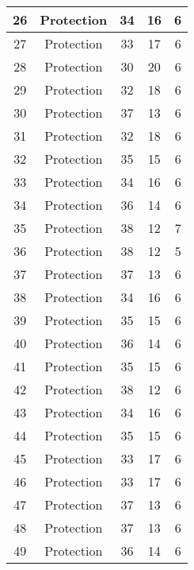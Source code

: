 \documentclass[results.tex]{subfiles}
\begin{document}
\begin{center}
\begin{tabular}{| c || c | c | c | c |}
    \hline
    26 & Protection & 34 & 16 & 6 \\ 
    \hline
    27 & Protection & 33 & 17 & 6 \\ 
    \hline
    28 & Protection & 30 & 20 & 6 \\ 
    \hline
    29 & Protection & 32 & 18 & 6 \\ 
    \hline
    30 & Protection & 37 & 13 & 6 \\ 
    \hline
    31 & Protection & 32 & 18 & 6 \\ 
    \hline
    32 & Protection & 35 & 15 & 6 \\ 
    \hline
    33 & Protection & 34 & 16 & 6 \\ 
    \hline
    34 & Protection & 36 & 14 & 6 \\ 
    \hline
    35 & Protection & 38 & 12 & 7 \\ 
    \hline
    36 & Protection & 38 & 12 & 5 \\ 
    \hline
    37 & Protection & 37 & 13 & 6 \\ 
    \hline
    38 & Protection & 34 & 16 & 6 \\ 
    \hline
    39 & Protection & 35 & 15 & 6 \\ 
    \hline
    40 & Protection & 36 & 14 & 6 \\ 
    \hline
    41 & Protection & 35 & 15 & 6 \\ 
    \hline
    42 & Protection & 38 & 12 & 6 \\ 
    \hline
    43 & Protection & 34 & 16 & 6 \\ 
    \hline
    44 & Protection & 35 & 15 & 6 \\ 
    \hline
    45 & Protection & 33 & 17 & 6 \\ 
    \hline
    46 & Protection & 33 & 17 & 6 \\ 
    \hline
    47 & Protection & 37 & 13 & 6 \\ 
    \hline
    48 & Protection & 37 & 13 & 6 \\ 
    \hline
    49 & Protection & 36 & 14 & 6 \\ 
    \hline   \end{tabular}
\end{center}
\end{document}
